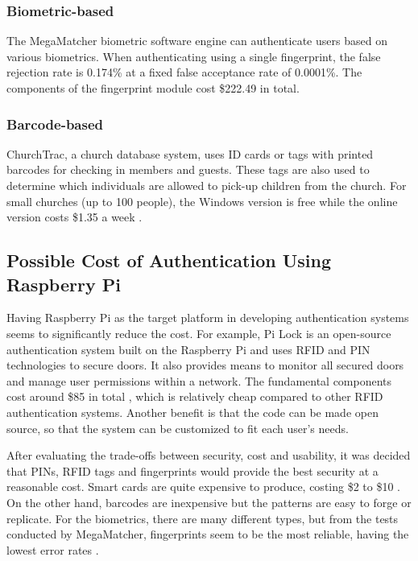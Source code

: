 \subsubsection{Biometric-based}
The MegaMatcher biometric software engine can authenticate users based on various biometrics. When authenticating using a single fingerprint, the false rejection rate is 0.174\% at a fixed false acceptance rate of 0.0001\%\cite{MegaMatcher}. The components of the fingerprint module cost \$222.49 in total\cite{MegaMatcherPrices}.

\subsubsection{Barcode-based}
ChurchTrac, a church database system, uses ID cards or tags with printed barcodes for checking in members and guests. These tags are also used to determine which individuals are allowed to pick-up children from the church. For small churches (up to 100 people), the Windows version is free while the online version costs \$1.35 a week \cite{ChurchTrac}.


\subsection{Possible Cost of Authentication Using Raspberry Pi}
Having Raspberry Pi as the target platform in developing authentication systems seems to significantly reduce the cost. For example, Pi Lock is an open-source authentication system built on the Raspberry Pi and uses RFID and PIN technologies to secure doors. It also provides means to monitor all secured doors and manage user permissions within a network. The fundamental components cost around \$85 in total \cite{PiLock}, which is relatively cheap compared to other RFID authentication systems. Another benefit is that the code can be made open source, so that the system can be customized to fit each user's needs.

After evaluating the trade-offs between security, cost and usability, it was decided that PINs, RFID tags and fingerprints would provide the best security at a reasonable cost. Smart cards are quite expensive to produce, costing \$2 to \$10 \cite{CardwerkSmartCard}. On the other hand, barcodes are inexpensive but the patterns are easy to forge or replicate. For the biometrics, there are many different types, but from the tests conducted by MegaMatcher, fingerprints seem to be the most reliable, having the lowest error rates \cite{MegaMatcher}.


